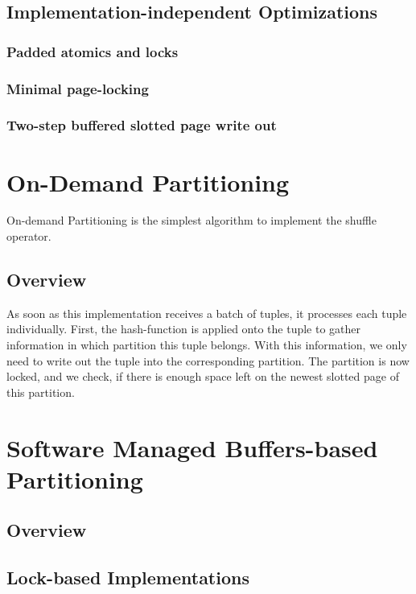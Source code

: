 \subsection{Implementation-independent Optimizations}
\subsubsection{Padded atomics and locks}
\subsubsection{Minimal page-locking}
\subsubsection{Two-step buffered slotted page write out}

\section{On-Demand Partitioning}
On-demand Partitioning is the simplest algorithm to implement the shuffle operator.
\subsection{Overview}
As soon as this implementation receives a batch of tuples, it processes each tuple individually.
First, the hash-function is applied onto the tuple to gather information in which partition this tuple belongs.
With this information, we only need to write out the tuple into the corresponding partition.
The partition is now locked, and we check, if there is enough space left on the newest slotted page of this partition.


\section{Software Managed Buffers-based Partitioning}
\subsection{Overview}
\subsection{Lock-based Implementations}
